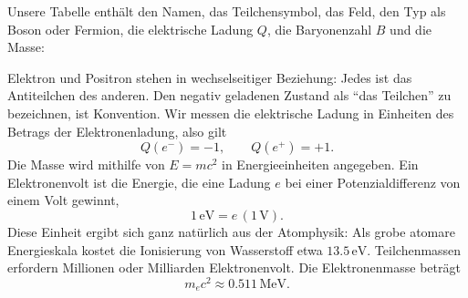 Unsere Tabelle enthält den Namen, das Teilchensymbol, das Feld, den Typ als Boson oder Fermion, die elektrische Ladung \(Q\), die Baryonenzahl \(B\) und die Masse:

\begin{table}[h]
\centering
{}%
\caption{Die Einträge für Photon und Elektron--Positron am Anfang des Teilchenkatalogs.}
\end{table}

Elektron und Positron stehen in wechselseitiger Beziehung: Jedes ist das Antiteilchen des anderen. Den negativ geladenen Zustand als ``das Teilchen'' zu bezeichnen, ist Konvention. Wir messen die elektrische Ladung in Einheiten des Betrags der Elektronenladung, also gilt
\begin{equation}
Q(e^-)=-1,\qquad Q(e^+)=+1.
\end{equation}
Die Masse wird mithilfe von \(E=mc^2\) in Energieeinheiten angegeben. Ein Elektronenvolt ist die Energie, die eine Ladung \(e\) bei einer Potenzialdifferenz von einem Volt gewinnt,
\begin{equation}
1\,\mathrm{eV}=e\,(1\,\mathrm V).
\end{equation}
Diese Einheit ergibt sich ganz natürlich aus der Atomphysik: Als grobe atomare Energieskala kostet die Ionisierung von Wasserstoff etwa \(13.5\,\mathrm{eV}\). Teilchenmassen erfordern Millionen oder Milliarden Elektronenvolt. Die Elektronenmasse beträgt
\begin{equation}
m_e c^2 \approx 0.511\,\mathrm{MeV}.
\end{equation}

\begin{classroomqa}
\end{classroomqa}

